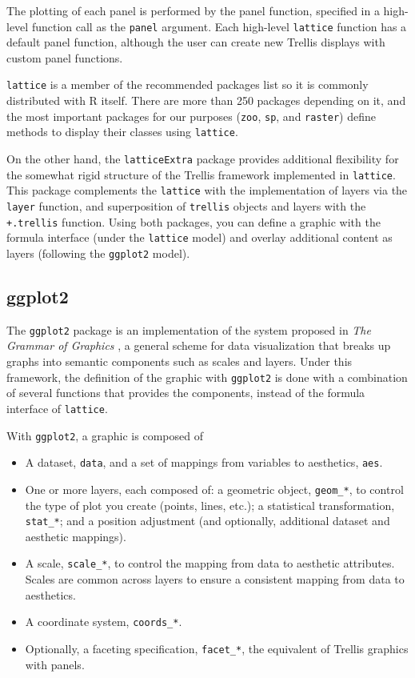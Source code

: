 The plotting of each panel is performed by the panel function, specified in
a high-level function call as the \texttt{panel} argument. Each
high-level \texttt{lattice} function has a default panel function,
although the user can create new Trellis displays with custom panel
functions.

\texttt{lattice} is a member of the recommended packages list so it is
commonly distributed with \textsf{R} itself. There are more than 250
packages depending on it, and the most important packages for our
purposes (\texttt{zoo}, \texttt{sp}, and \texttt{raster}) define
methods to display their classes using \texttt{lattice}.


On the other hand, the \texttt{latticeExtra} package
\cite{Sarkar.Andrews2012} provides additional flexibility for the
somewhat rigid structure of the Trellis framework implemented in
\texttt{lattice}. This package complements the \texttt{lattice} with
the implementation of layers via the \texttt{layer} function, and
superposition of \texttt{trellis} objects and layers with the
\lstinline{+.trellis} function. Using both packages, you can define a
graphic with the formula interface (under the \texttt{lattice} model)
and overlay additional content as layers (following the
\texttt{ggplot2} model).

\subsection{ggplot2}
\label{sec:ggplot2}


The \texttt{ggplot2} package \cite{Wickham2009} is an implementation
of the system proposed in \emph{The Grammar of Graphics}
\cite{Wilkinson1999}, a general scheme for data visualization that
breaks up graphs into semantic components such as scales and
layers. Under this framework, the definition of the graphic with
\texttt{ggplot2} is done with a combination of several functions
that provides the components, instead of the formula interface of
\texttt{lattice}.

With \texttt{ggplot2}, a graphic is composed of
\begin{itemize}
\item A dataset, \texttt{data}, and a set of mappings from variables
  to aesthetics, \texttt{aes}.
\item One or more layers, each composed of: a geometric object,
  \texttt{geom\_*}, to control the type of plot you create (points,
  lines, etc.); a statistical transformation, \texttt{stat\_*}; and a
  position adjustment (and optionally, additional dataset and
  aesthetic mappings).
\item A scale, \texttt{scale\_*}, to control the mapping from data to
  aesthetic attributes. Scales are common across layers to ensure a
  consistent mapping from data to aesthetics.
\item A coordinate system, \texttt{coords\_*}.
\item Optionally, a faceting specification, \texttt{facet\_*}, the
  equivalent of Trellis graphics with panels.
\end{itemize}

